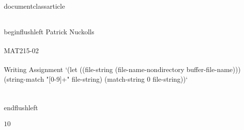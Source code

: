 \\documentclass{article}
\begin{document}
\\begin{flushleft}
	Patrick Nuckolls \\\\
	MAT215-02 \\\\
	Writing Assignment `(let ((file-string (file-name-nondirectory buffer-file-name))) (string-match "[0-9]+" file-string) (match-string 0 file-string))` \\\\
\\end{flushleft}

$1$0

\
\end{document}
